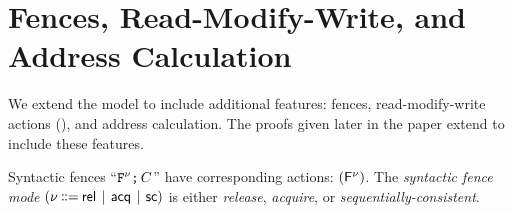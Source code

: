 \section{Fences, Read-Modify-Write, and Address Calculation}
\label{sec:variants}

We extend the model to include additional features: fences, read-modify-write
actions (\RMWs), and address calculation. The proofs given later in the paper
extend to include these features.


Syntactic fences
``$\texttt{F}^{\nu} \texttt{;}\,\allowbreak C$'' have corresponding  actions: $(\smash{\mathsf{F}^{\nu}})$.  The \emph{syntactic fence mode}
$(\fmode \!\!\BNFDEF\!\! \modeREL \!\BNFSEP\! \modeACQ \!\BNFSEP\! \modeSC)$
is either \emph{release}, \emph{acquire}, or \emph{sequentially-consistent}.

